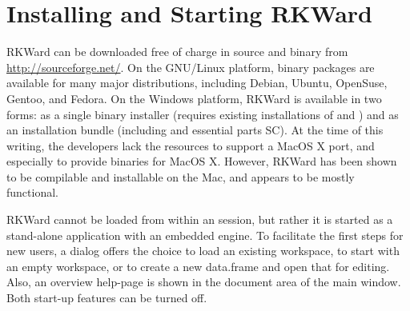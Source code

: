 \section{Installing and Starting RKWard}
RKWard can be downloaded free of charge in source and binary from
\url{http://sourceforge.net/}. On the GNU/Linux
platform, binary packages are available for many major distributions,
including Debian, Ubuntu, OpenSuse, Gentoo, and Fedora. On the Windows
platform, RKWard is available in two forms: as a single binary
installer (requires existing installations of
 and ) and
as an installation bundle (including  and
essential parts  SC). At the time of
this writing, the developers lack the resources to support a MacOS X
port, and especially to provide binaries for MacOS X. However, RKWard
has been shown to be compilable and installable on the Mac, and appears
to be mostly functional.

RKWard cannot be loaded from within an 
session, but rather it is started as a stand-alone application with an
embedded  engine. To facilitate the first
steps for new users, a dialog offers the choice to load an existing
workspace, to start with an empty workspace, or to create a new
data.frame and open that for editing. Also, an overview help-page is
shown in the document area of the main window. Both start-up features
can be turned off.